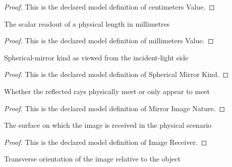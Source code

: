 \begin{proof}
  This is the declared model definition of centimeters Value.
\end{proof}
\begin{definition}
  \label{def:physics:phyx-mini-0038:phyxminiproblems-problemphyxmini0038-millimetersvalue}
  The scalar readout of a physical length in millimetres
\end{definition}
\begin{proof}
  This is the declared model definition of millimeters Value.
\end{proof}
\begin{definition}
  \label{def:physics:phyx-mini-0038:phyxminiproblems-problemphyxmini0038-sphericalmirrorkind}
  Spherical-mirror kind as viewed from the incident-light side
\end{definition}
\begin{proof}
  This is the declared model definition of Spherical Mirror Kind.
\end{proof}
\begin{definition}
  \label{def:physics:phyx-mini-0038:phyxminiproblems-problemphyxmini0038-mirrorimagenature}
  Whether the reflected rays physically meet or only appear to meet
\end{definition}
\begin{proof}
  This is the declared model definition of Mirror Image Nature.
\end{proof}
\begin{definition}
  \label{def:physics:phyx-mini-0038:phyxminiproblems-problemphyxmini0038-imagereceiver}
  The surface on which the image is received in the physical scenario
\end{definition}
\begin{proof}
  This is the declared model definition of Image Receiver.
\end{proof}
\begin{definition}
  \label{def:physics:phyx-mini-0038:phyxminiproblems-problemphyxmini0038-imageorientation}
  Transverse orientation of the image relative to the object
\end{definition}

